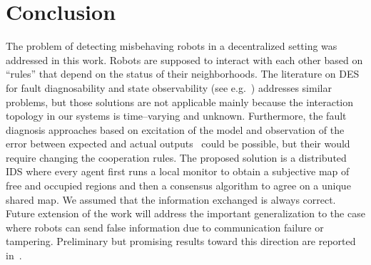 \documentclass[journal, onecolumn, 12pt]{styles/IEEEtran}
\renewcommand{\AFnewpage}{}
\begin{document}

%
%
%

\AFnewpage

\section{Conclusion}
\label{sec:conclusion}

The problem of detecting misbehaving robots in a decentralized setting
was addressed in this work. Robots are supposed to interact with each
other based on ``rules'' that depend on the status of their neighborhoods. The literature on DES for fault diagnosability and state observability (see e.g.~\cite{ramadge1989cde, balluchi2002doh, zad2003fdd}) addresses similar problems, but those solutions are not applicable mainly because the interaction topology in our systems is time--varying and unknown. Furthermore, the fault diagnosis approaches based on excitation of the model and observation of the error between expected and actual outputs~\cite{monteriu2007mbs} could be possible, but their would require changing the cooperation rules. The proposed solution is a distributed IDS where every agent first runs a local monitor to obtain a subjective map of free and occupied regions and then a consensus algorithm to agree on a unique shared map. We assumed that the information exchanged is always correct. Future extension of the work will address the important generalization to the case where robots can send false information due to communication failure or tampering. Preliminary but promising results toward this direction are reported in~\cite{ssrr08-fagiolini}.
\end{document}

